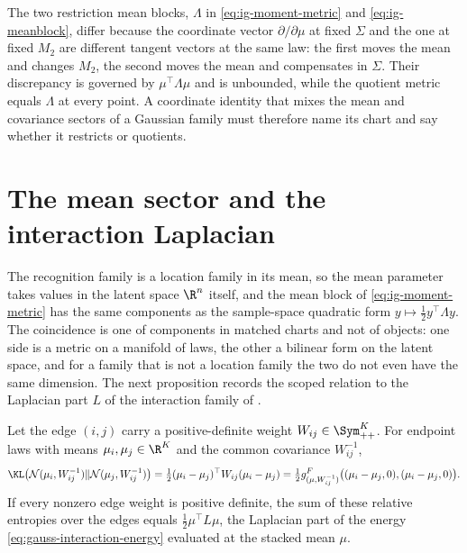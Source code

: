 \medskip
The two restriction mean blocks, \(\Lambda\) in \eqref{eq:ig-moment-metric} and
\eqref{eq:ig-meanblock}, differ because the coordinate vector
\(\partial/\partial\mu\) at fixed \(\Sigma\) and the one at fixed \(M_2\) are
different tangent vectors at the same law: the first moves the mean and changes
\(M_2\), the second moves the mean and compensates in \(\Sigma\). Their
discrepancy is governed by \(\mu^\top\Lambda\mu\) and is unbounded, while the
quotient metric equals \(\Lambda\) at every point. A coordinate identity that
mixes the mean and covariance sectors of a Gaussian family must therefore name
its chart and say whether it restricts or quotients.

\section{The mean sector and the interaction Laplacian}

The recognition family is a location family in its mean, so the mean parameter
takes values in the latent space \(\R^n\) itself, and the mean block of
\eqref{eq:ig-moment-metric} has the same components as the sample-space quadratic
form \(y\mapsto\tfrac12y^\top\Lambda y\). The coincidence is one of components in
matched charts and not of objects: one side is a metric on a manifold of laws,
the other a bilinear form on the latent space, and for a family that is not a
location family the two do not even have the same dimension. The next proposition
records the scoped relation to the Laplacian part \(L\) of the interaction family
of .

Let the edge \((i,j)\) carry a positive-definite weight
\(W_{ij}\in\Sym_{++}^K\). For endpoint laws with means \(\mu_i,\mu_j\in\R^K\) and the
common covariance \(W_{ij}^{-1}\),
\begin{equation}
\KL\bigl(\mathcal N(\mu_i,W_{ij}^{-1})\Vert\mathcal N(\mu_j,W_{ij}^{-1})\bigr)
=\tfrac12(\mu_i-\mu_j)^\top W_{ij}(\mu_i-\mu_j)
=\tfrac12g^F_{(\mu,W_{ij}^{-1})}\bigl((\mu_i-\mu_j,0),(\mu_i-\mu_j,0)\bigr).
\label{eq:ig-fixed-covariance-kl-fisher}
\end{equation}
If every nonzero edge weight is positive definite, the sum of these relative
entropies over the edges equals \(\tfrac12\mu^\top L\mu\), the Laplacian part of the
energy \eqref{eq:gauss-interaction-energy} evaluated at the stacked mean \(\mu\).

